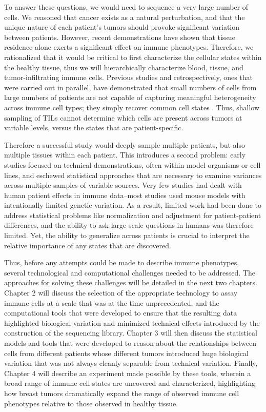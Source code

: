 To answer these questions, we would need to sequence a very large number of cells. 
We reasoned that cancer exists as a natural perturbation, and that the unique nature of each patient’s tumors should provoke significant variation between patients. 
However, recent demonstrations have shown that tissue residence alone exerts a significant effect on immune phenotypes. %
Therefore, we rationalized that it would be critical to first characterize the cellular states within the healthy tissue, thus we will hierarchically characterize blood, tissue, and tumor-infiltrating immune cells.
Previous studies and retrospectively, ones that were carried out in parallel, have demonstrated that small numbers of cells from large numbers of patients are not capable of capturing meaningful heterogeneity across immune cell types; they simply recover common cell states \citep{Chung2017}.
Thus, shallow sampling of TILs cannot determine which cells are present across tumors at variable levels, versus the states that are patient-specific. 

Therefore a successful study would deeply sample multiple patients, but also multiple tissues within each patient. 
This introduces a second problem: early studies focused on technical demonstrations, often within model organisms or cell lines, and eschewed statistical approaches that are necessary to examine variances across multiple samples of variable sources.
Very few studies had dealt with human patient effects in immune data--most studies used mouse models with intentionally limited genetic variation.
As a result, limited work had been done to address statistical problems like normalization and adjustment for patient-patient differences, and the ability to ask large-scale questions in humans was therefore limited. 
Yet, the ability to generalize across patients is crucial to interpret the relative importance of any states that are discovered.  

Thus, before any attempts could be made to describe immune phenotypes, several technological and computational challenges needed to be addressed. 
The approaches for solving these challenges will be detailed in the next two chapters. 
Chapter 2 will discuss the selection of the appropriate technology to assay immune cells at a scale that was at the time unprecedented, and the computational tools that were developed to ensure that the resulting data highlighted biological variation and minimized technical effects introduced by the construction of the sequencing library. 
Chapter 3 will then discuss the statistical models and tools that were developed to reason about the relationships between cells from different patients whose different tumors introduced huge biological variation that was not always cleanly separable from technical variation. 
Finally, Chapter 4 will describe an experiment made possible by these tools, wherein a broad range of immune cell states are uncovered and characterized, highlighting how breast tumors dramatically expand the range of observed immune cell phenotypes relative to those observed in healthy tissue. 

